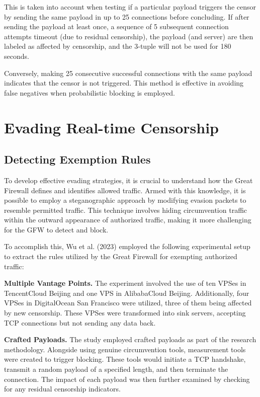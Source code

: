 This is taken into account when testing if a particular payload triggers the censor by sending the same payload in up to 25 connections before concluding. If after sending the payload at least once, a sequence of 5 subsequent connection attempts timeout (due to residual censorship), the payload (and server) are then labeled as affected by censorship, and the 3-tuple will not be used for 180 seconds. 

Conversely, making 25 consecutive successful connections with the same payload indicates that the censor is not triggered. This method is effective in avoiding false negatives when probabilistic blocking is employed.\cite{wu2023great}

\section{Evading Real-time Censorship}

\subsection{Detecting Exemption Rules}
To develop effective evading strategies, it is crucial to understand how the Great Firewall defines and identifies allowed traffic. Armed with this knowledge, it is possible to employ a steganographic approach by modifying evasion packets to resemble permitted traffic. This technique involves hiding circumvention traffic within the outward appearance of authorized traffic, making it more challenging for the GFW to detect and block. 

To accomplish this, Wu et al. (2023) employed the following experimental setup to extract the rules utilized by the Great Firewall for exempting authorized traffic:

\textbf{Multiple Vantage Points.} The experiment involved the use of ten VPSes in TencentCloud Beijing and one VPS in AlibabaCloud Beijing. Additionally, four VPSes in DigitalOcean San Francisco were utilized, three of them being affected by new censorship. These VPSes were transformed into sink servers, accepting TCP connections but not sending any data back.

\textbf{Crafted Payloads.} The study employed crafted payloads as part of the research methodology. Alongside using genuine circumvention tools, measurement tools were created to trigger blocking. These tools would initiate a TCP handshake, transmit a random payload of a specified length, and then terminate the connection. The impact of each payload was then further examined by checking for any residual censorship indicators.

